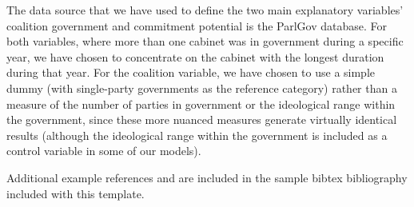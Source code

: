 \documentclass{cup_PSRM}
\begin{document}
The data source that we have used to define the two main explanatory variables'
coalition government and commitment potential is the ParlGov database. For both variables, where more than one cabinet was in government
during a specific year, we have chosen to concentrate on the cabinet with the longest
duration during that year. For the coalition variable, we have chosen to use a simple
dummy (with single-party governments as the reference category) rather than a measure
of the number of parties in government or the ideological range within
the government, since these more nuanced measures generate virtually
identical results (although the ideological range within the government is included as a
control variable in some of our models).

Additional example references \citep{RePEc:aea:aecrev:v:81:y:1991:i:5:p:1170-88} and \citep{19995} are included in the sample bibtex bibliography included with this template.

\printbibliography
\end{document}
